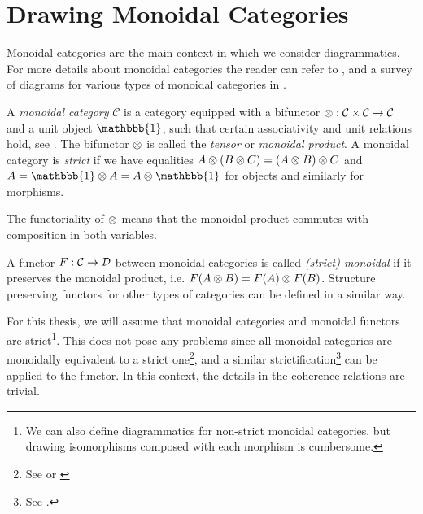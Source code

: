 \section{Drawing Monoidal Categories}
\label{sec:monoidal-cat}

Monoidal categories are the main context in which we consider diagrammatics. For more details about monoidal categories the reader can refer to \cite{tensor-categories}, and a survey of diagrams for various types of monoidal categories in \cite{selinger-survey-of-graphical-monoidal-categories}.

\begin{definition}
    A \textit{monoidal category} $\mathcal{C}$ is a category equipped with a bifunctor $\otimes: \mathcal{C} \times \mathcal{C} \to \mathcal{C}$ and a unit object $\mathbbb{1}$, such that certain associativity and unit relations hold, see \cite[Definition 2.1.1, 2.2.8]{tensor-categories}. The bifunctor $\otimes$ is called the \textit{tensor} or \textit{monoidal product}. A monoidal category is \textit{strict} if we have equalities $A \otimes (B \otimes C) = (A \otimes B) \otimes C$ and $A = \mathbbb{1} \tensor A = A \tensor \mathbbb{1}$ for objects and similarly for morphisms.
\end{definition}

The functoriality of $\otimes$ means that the monoidal product commutes with composition in both variables.

\begin{definition}
    A functor $F: \mathcal{C} \to \mathcal{D}$ between monoidal categories is called \textit{(strict) monoidal} if it preserves the monoidal product, i.e. $F(A \otimes B) = F(A) \otimes F(B)$. Structure preserving functors for other types of categories can be defined in a similar way.
\end{definition}

For this thesis, we will assume that monoidal categories and monoidal functors are strict\footnote{We can also define diagrammatics for non-strict monoidal categories, but drawing isomorphisms composed with each morphism is cumbersome.}. This does not pose any problems since all monoidal categories are monoidally equivalent to a strict one\footnote{See \cite[\nopp VII.2]{maclane-category-theory} or \cite[Theorem 2.8.5]{tensor-categories}}, and a similar strictification\footnote{See \cite{power-general-coherence}.} can be applied to the functor. In this context, the details in the coherence relations are trivial.

